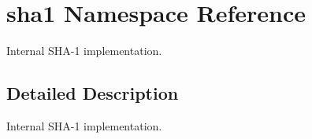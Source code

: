 \hypertarget{namespacesha1}{}\section{sha1 Namespace Reference}
\label{namespacesha1}


Internal S\+H\+A-\/1 implementation.  




\subsection{Detailed Description}
Internal S\+H\+A-\/1 implementation. 